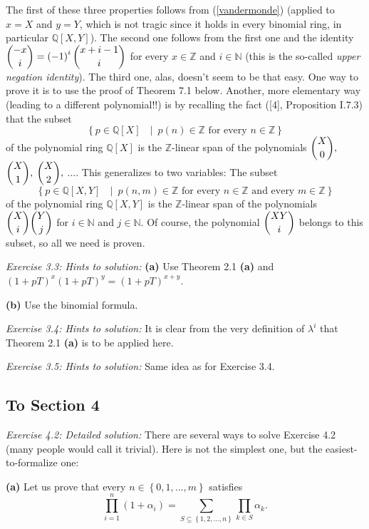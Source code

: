 \documentclass[numbers=enddot,12pt,final,onecolumn,notitlepage]{scrartcl}%
\begin{document}
The first of these three properties follows from (\ref{vandermonde}) (applied
to $x=X$ and $y=Y$, which is not tragic since it holds in every binomial ring,
in particular $\mathbb{Q}\left[  X,Y\right]  $). The second one follows from
the first one and the identity $\dbinom{-x}{i}=\left(  -1\right)  ^{i}%
\dbinom{x+i-1}{i}$ for every $x\in\mathbb{Z}$ and $i\in\mathbb{N}$ (this is
the so-called \textit{upper negation identity}). The third one, alas, doesn't
seem to be that easy. One way to prove it is to use the proof of Theorem 7.1
below. Another, more elementary way (leading to a different polynomial!!) is
by recalling the fact ([4], Proposition I.7.3) that the subset%
\[
\left\{  p\in\mathbb{Q}\left[  X\right]  \text{ }\mid\ p\left(  n\right)
\in\mathbb{Z}\text{ for every }n\in\mathbb{Z}\right\}
\]
of the polynomial ring $\mathbb{Q}\left[  X\right]  $ is the $\mathbb{Z}%
$-linear span of the polynomials $\dbinom{X}{0},$ $\dbinom{X}{1},$ $\dbinom
{X}{2},$ $...$. This generalizes to two variables: The subset
\[
\left\{  p\in\mathbb{Q}\left[  X,Y\right]  \text{ }\mid\ p\left(  n,m\right)
\in\mathbb{Z}\text{ for every }n\in\mathbb{Z}\text{ and every }m\in
\mathbb{Z}\right\}
\]
of the polynomial ring $\mathbb{Q}\left[  X,Y\right]  $ is the $\mathbb{Z}%
$-linear span of the polynomials $\dbinom{X}{i}\dbinom{Y}{j}$ for
$i\in\mathbb{N}$ and $j\in\mathbb{N}$. Of course, the polynomial $\dbinom
{XY}{i}$ belongs to this subset, so all we need is proven.

\textit{Exercise 3.3: Hints to solution:} \textbf{(a)} Use Theorem 2.1
\textbf{(a)} and $\left(  1+pT\right)  ^{x}\left(  1+pT\right)  ^{y}=\left(
1+pT\right)  ^{x+y}$.

\textbf{(b)} Use the binomial formula.

\textit{Exercise 3.4: Hints to solution:} It is clear from the very definition
of $\lambda^{i}$ that Theorem 2.1 \textbf{(a)} is to be applied here.

\textit{Exercise 3.5: Hints to solution:} Same idea as for Exercise 3.4.

\subsection{To Section 4}

\textit{Exercise 4.2: Detailed solution:} There are several ways to solve
Exercise 4.2 (many people would call it trivial). Here is not the simplest
one, but the easiest-to-formalize one:

\textbf{(a)} Let us prove that every $n\in\left\{  0,1,...,m\right\}  $
satisfies%
\begin{equation}
\prod\limits_{i=1}^{n}\left(  1+\alpha_{i}\right)  =\sum\limits_{S\subseteq
\left\{  1,2,...,n\right\}  }\prod\limits_{k\in S}\alpha_{k}. \label{4.2.pf.1}%
\end{equation}
\end{document}
